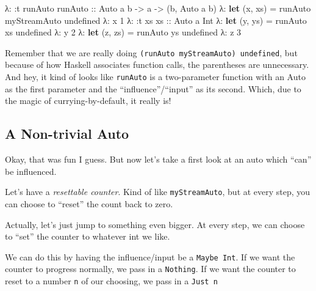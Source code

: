 \documentclass[]{article}
\newenvironment{Shaded}{}{}
\newcommand{\KeywordTok}[1]{\textcolor[rgb]{0.00,0.44,0.13}{\textbf{{#1}}}}
\newcommand{\DataTypeTok}[1]{\textcolor[rgb]{0.56,0.13,0.00}{{#1}}}
\newcommand{\DecValTok}[1]{\textcolor[rgb]{0.25,0.63,0.44}{{#1}}}
\newcommand{\OtherTok}[1]{\textcolor[rgb]{0.00,0.44,0.13}{{#1}}}
\newcommand{\FunctionTok}[1]{\textcolor[rgb]{0.02,0.16,0.49}{{#1}}}
\newcommand{\NormalTok}[1]{{#1}}
\begin{document}
\begin{Shaded}
\begin{Highlighting}[]
\NormalTok{λ}\FunctionTok{:} \FunctionTok{:}\NormalTok{t runAuto}
\OtherTok{runAuto ::} \DataTypeTok{Auto} \NormalTok{a b }\OtherTok{->} \NormalTok{a }\OtherTok{->} \NormalTok{(b, }\DataTypeTok{Auto} \NormalTok{a b)}
\NormalTok{λ}\FunctionTok{:} \KeywordTok{let} \NormalTok{(x, xs) }\FunctionTok{=} \NormalTok{runAuto myStreamAuto undefined}
\NormalTok{λ}\FunctionTok{:} \NormalTok{x}
\DecValTok{1}
\NormalTok{λ}\FunctionTok{:} \FunctionTok{:}\NormalTok{t xs}
\OtherTok{xs ::} \DataTypeTok{Auto} \NormalTok{a }\DataTypeTok{Int}
\NormalTok{λ}\FunctionTok{:} \KeywordTok{let} \NormalTok{(y, ys) }\FunctionTok{=} \NormalTok{runAuto xs undefined}
\NormalTok{λ}\FunctionTok{:} \NormalTok{y}
\DecValTok{2}
\NormalTok{λ}\FunctionTok{:} \KeywordTok{let} \NormalTok{(z, zs) }\FunctionTok{=} \NormalTok{runAuto ys undefined}
\NormalTok{λ}\FunctionTok{:} \NormalTok{z}
\DecValTok{3}
\end{Highlighting}
\end{Shaded}

Remember that we are really doing
\texttt{(runAuto\ myStreamAuto)\ undefined}, but because of how Haskell
associates function calls, the parentheses are unnecessary. And hey, it
kind of looks like \texttt{runAuto} is a two-parameter function with an
Auto as the first parameter and the ``influence''/``input'' as its
second. Which, due to the magic of currying-by-default, it really is!

\subsection{A Non-trivial Auto}\label{a-non-trivial-auto}

Okay, that was fun I guess. But now let's take a first look at an auto
which ``can'' be influenced.

Let's have a \emph{resettable counter}. Kind of like
\texttt{myStreamAuto}, but at every step, you can choose to ``reset''
the count back to zero.

Actually, let's just jump to something even bigger. At every step, we
can choose to ``set'' the counter to whatever int we like.

We can do this by having the influence/input be a \texttt{Maybe\ Int}.
If we want the counter to progress normally, we pass in a
\texttt{Nothing}. If we want the counter to reset to a number \texttt{n}
of our choosing, we pass in a \texttt{Just\ n}
\end{document}
